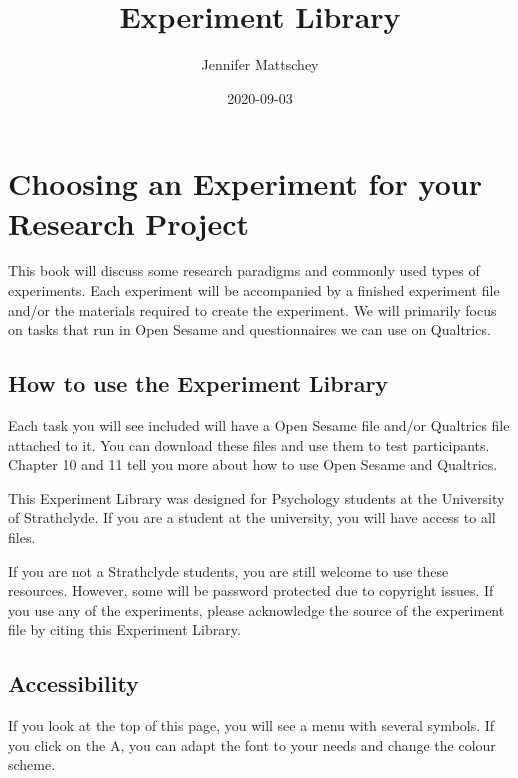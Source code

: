 \documentclass[
]{book}
\title{Experiment Library}
\author{Jennifer Mattschey}
\date{2020-09-03}
\begin{document}
\maketitle

{
\setcounter{tocdepth}{1}
\tableofcontents
}
\hypertarget{choosing-an-experiment-for-your-research-project}{%
\chapter{Choosing an Experiment for your Research Project}\label{choosing-an-experiment-for-your-research-project}}

This book will discuss some research paradigms and commonly used types of experiments. Each experiment will be accompanied by a finished experiment file and/or the materials required to create the experiment. We will primarily focus on tasks that run in Open Sesame and questionnaires we can use on Qualtrics.

\hypertarget{how-to-use-the-experiment-library}{%
\section{How to use the Experiment Library}\label{how-to-use-the-experiment-library}}

Each task you will see included will have a Open Sesame file and/or Qualtrics file attached to it. You can download these files and use them to test participants. Chapter 10 and 11 tell you more about how to use Open Sesame and Qualtrics.

This Experiment Library was designed for Psychology students at the University of Strathclyde. If you are a student at the university, you will have access to all files.

If you are not a Strathclyde students, you are still welcome to use these resources. However, some will be password protected due to copyright issues. If you use any of the experiments, please acknowledge the source of the experiment file by citing this Experiment Library.

\hypertarget{accessibility}{%
\section{Accessibility}\label{accessibility}}

If you look at the top of this page, you will see a menu with several symbols. If you click on the A, you can adapt the font to your needs and change the colour scheme.
\end{document}
